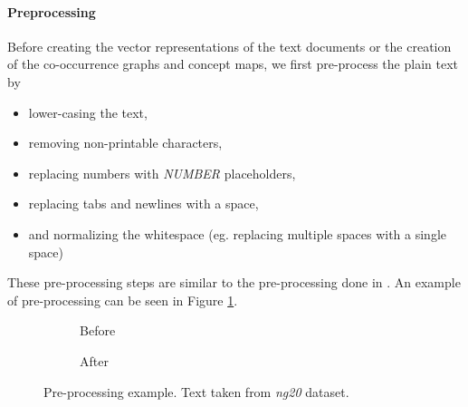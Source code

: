 \paragraph{Preprocessing}
Before creating the vector representations of the text documents or the creation of the co-occurrence graphs and concept maps, we first pre-process the plain text by

\begin{itemize}
\item{lower-casing the text,}
\item{removing non-printable characters,}
\item{replacing numbers with \textit{NUMBER} placeholders,}
\item{replacing tabs and newlines with a space,}
\item{and normalizing the whitespace (eg. replacing multiple spaces with a single space)}
\end{itemize}
These pre-processing steps are similar to the pre-processing done in \cite{Cachopo2007}.
An example of pre-processing can be seen in Figure \ref{fig:preprocessing_example}.

\begin{figure}[htb!]
	\begin{subfigure}[b]{0.45\linewidth}
\noindent{}
    \caption{Before}
    \end{subfigure}
\hspace{0.5in}
	\begin{subfigure}[b]{0.45\linewidth}
\noindent{}
\vspace{0.5in}
    \caption{After}
    \end{subfigure}
	\caption{Pre-processing example. Text taken from \textit{ng20} dataset.}\label{fig:preprocessing_example}
\end{figure}

